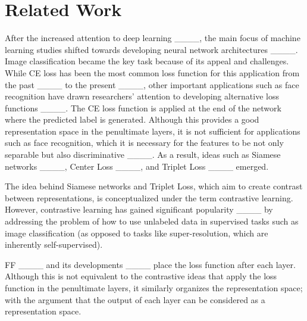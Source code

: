 \section{Related Work}
\label{sec:related}
After the increased attention to deep learning ____, the main focus of machine learning studies shifted towards developing neural network architectures ____. Image classification became the key task because of its appeal and challenges. While CE loss has been the most common loss function for this application from the past ____ to the present ____, other important applications such as face recognition have drawn researchers' attention to developing alternative loss functions ____. The CE loss function is applied at the end of the network where the predicted label is generated. Although this provides a good representation space in the penultimate layers, it is not sufficient for applications such as face recognition, which it is necessary for the features to be not only separable but also discriminative ____. As a result, ideas such as Siamese networks ____, Center Loss ____, and Triplet Loss ____ emerged. 

The idea behind Siamese networks and Triplet Loss, which aim to create contrast between representations, is conceptualized under the term contrastive learning. However, contrastive learning has gained significant popularity ____ by addressing the problem of how to use unlabeled data in supervised tasks such as image classification (as opposed to tasks like super-resolution, which are inherently self-supervised).

FF ____ and its developments ____ place the loss function after each layer. Although this is not equivalent to the contrastive ideas that apply the loss function in the penultimate layers, it similarly organizes the representation space; with the argument that the output of each layer can be considered as a representation space.

